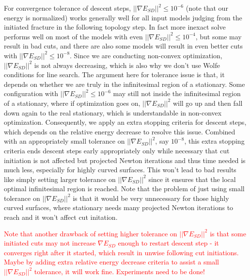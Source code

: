 For convergence tolerance of descent steps, $||\nabla E_{SD}||^2 \leq 10^{-6}$ (note that our energy is normalized) works generally well for all input models judging from the initiated fracture in the following topology step. In fact more inexact solve performs well on most of the models with even $||\nabla E_{SD}||^2 \leq 10^{-4}$, but some may result in bad cuts, and there are also some models will result in even better cuts with $||\nabla E_{SD}||^2 \leq 10^{-8}$. Since we are conducting non-convex optimization, $||\nabla E_{SD}||^2$ is not always decreasing, which is also why we don't use Wolfe conditions for line search. The argument here for tolerance issue is that, it depends on whether we are truly in the infinitesimal region of a stationary. Some configuration with $||\nabla E_{SD}||^2 \leq 10^{-6}$ may still not inside the infinitesimal region of a stationary, where if optimization goes on, $||\nabla E_{SD}||^2$ will go up and then fall down again to the real stationary, which is understandable in non-convex optimization. Consequently, we apply an extra stopping criteria for descent steps, which depends on the relative energy decrease to resolve this issue. Combined with an appropriately small tolerance on $||\nabla E_{SD}||^2$, say $10^{-8}$, this extra stopping criteria ends descent steps early appropriately only while necessary that cut initiation is not affected but projected Newton iterations and thus time needed is much less, especially for highly curved surfaces. This won't lead to bad results like simply setting larger tolerance on $||\nabla E_{SD}||^2$ since it ensures that the local optimal infinitesimal region is reached. Note that the problem of just using small tolerance on $||\nabla E_{SD}||^2$ is that it would be very unnecessary for those highly curved surfaces, where stationary needs many projected Newton iterations to reach and it won't affect cut initation.

\textcolor{red}{
Note that another drawback of setting higher tolerance on $||\nabla E_{SD}||^2$ is that some initiated cuts may not increase $\nabla E_{SD}$ enough to restart descent step - it converges right after it started, which result in unwise following cut initiations. Maybe by adding extra relative energy decrease criteria to assist a small $||\nabla E_{SD}||^2$ tolerance, it will work fine. Experiments need to be done!
}